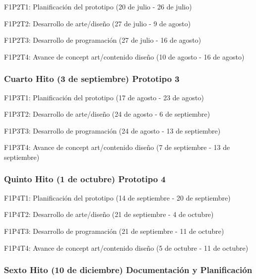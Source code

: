 \begin{compactitem}
  \item F1P2T1: Planificación del prototipo (20 de julio - 26 de julio)
  \item F1P2T2: Desarrollo de arte/diseño (27 de julio - 9 de agosto)
  \item F1P2T3: Desarrollo de programación (27 de julio - 16 de agosto)
  \item F1P2T4: Avance de concept art/contenido diseño (10 de agosto - 16 de agosto)
\end{compactitem}

\subsubsection{Cuarto Hito (3 de septiembre) Prototipo 3}

\begin{compactitem}
\item F1P3T1: Planificación del prototipo (17 de agosto - 23 de agosto)
\item F1P3T2: Desarrollo de arte/diseño (24 de agosto - 6 de septiembre)
\item F1P3T3: Desarrollo de programación (24 de agosto - 13 de septiembre)
\item F1P3T4: Avance de concept art/contenido diseño (7 de septiembre - 13 de septiembre)
\end{compactitem}


\subsubsection{Quinto Hito (1 de octubre) Prototipo 4}

\begin{compactitem}
\item F1P4T1: Planificación del prototipo (14 de septiembre - 20 de septiembre)
\item F1P4T2: Desarrollo de arte/diseño (21 de septiembre - 4 de octubre)
\item F1P4T3: Desarrollo de programación (21 de septiembre - 11 de octubre)
\item F1P4T4: Avance de concept art/contenido diseño (5 de octubre - 11 de octubre)
\end{compactitem}


\subsubsection{Sexto Hito (10 de diciembre) Documentación y Planificación}

